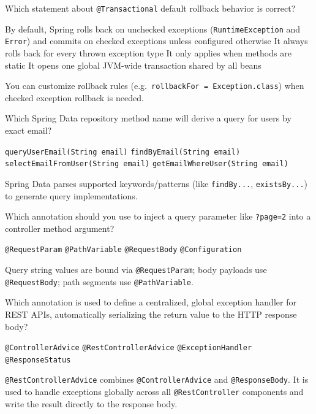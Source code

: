 \question[4]
Which statement about \texttt{@Transactional} default rollback behavior is correct?
\begin{choices}
  \CorrectChoice By default, Spring rolls back on unchecked exceptions (\texttt{RuntimeException} and \texttt{Error}) and commits on checked exceptions unless configured otherwise
  \choice It always rolls back for every thrown exception type
  \choice It only applies when methods are static
  \choice It opens one global JVM-wide transaction shared by all beans
\end{choices}
\begin{solution}
  You can customize rollback rules (e.g.\ \texttt{rollbackFor = Exception.class}) when checked exception rollback is needed.
\end{solution}

\question[4]
Which Spring Data repository method name will derive a query for users by exact email?
\begin{choices}
  \choice \texttt{queryUserEmail(String email)}
  \CorrectChoice \texttt{findByEmail(String email)}
  \choice \texttt{selectEmailFromUser(String email)}
  \choice \texttt{getEmailWhereUser(String email)}
\end{choices}
\begin{solution}
  Spring Data parses supported keywords/patterns (like \texttt{findBy...}, \texttt{existsBy...}) to generate query implementations.
\end{solution}

\question[4]
Which annotation should you use to inject a query parameter like \texttt{?page=2} into a controller method argument?
\begin{choices}
  \CorrectChoice \texttt{@RequestParam}
  \choice \texttt{@PathVariable}
  \choice \texttt{@RequestBody}
  \choice \texttt{@Configuration}
\end{choices}
\begin{solution}
  Query string values are bound via \texttt{@RequestParam}; body payloads use \texttt{@RequestBody}; path segments use \texttt{@PathVariable}.
\end{solution}


\question[4]
Which annotation is used to define a centralized, global exception handler for REST APIs, automatically serializing the return value to the HTTP response body?
\begin{choices}
  \choice \texttt{@ControllerAdvice}
  \CorrectChoice \texttt{@RestControllerAdvice}
  \choice \texttt{@ExceptionHandler}
  \choice \texttt{@ResponseStatus}
\end{choices}
\begin{solution}
  \texttt{@RestControllerAdvice} combines \texttt{@ControllerAdvice} and \texttt{@ResponseBody}. It is used to handle exceptions globally across all \texttt{@RestController} components and write the result directly to the response body.
\end{solution}

